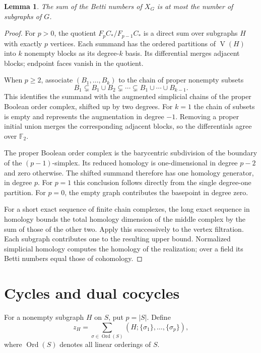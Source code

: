 \documentclass[11pt,a4paper]{article}
\newtheorem{lemma}[theorem]{Lemma}
\newcommand{\F}{\mathbb F_2}
\newcommand{\verts}{\operatorname{V}}
\begin{document}
\begin{lemma}\label{dimension}
The sum of the Betti numbers of $X_G$ is at most the number of subgraphs of $G$.
\end{lemma}
\begin{proof}
For $p>0$, the quotient $F_pC_*/F_{p-1}C_*$ is a direct sum over subgraphs
$H$ with exactly $p$ vertices. Each summand has the ordered partitions of
$\verts(H)$ into $k$ nonempty blocks as its degree-$k$ basis. Its differential
merges adjacent blocks; endpoint faces vanish in the quotient.

When $p\ge2$, associate $(B_1,\ldots,B_k)$ to the chain of proper nonempty
subsets
\[
 B_1\subsetneq B_1\cup B_2\subsetneq\cdots
 \subsetneq B_1\cup\cdots\cup B_{k-1}.
\]
This identifies the summand with the augmented simplicial chains of the
proper Boolean order complex, shifted up by two degrees. For $k=1$ the
chain of subsets is empty and represents the augmentation in degree $-1$.
Removing a proper initial union merges the corresponding adjacent blocks,
so the differentials agree over $\F$.

The proper Boolean order complex is the barycentric subdivision of the
boundary of the $(p-1)$-simplex. Its reduced homology is one-dimensional
in degree $p-2$ and zero otherwise. The shifted summand therefore has one
homology generator, in degree $p$. For $p=1$ this conclusion follows directly
from the single degree-one partition. For $p=0$, the empty graph contributes
the basepoint in degree zero.

For a short exact sequence of finite chain complexes, the long exact sequence
in homology bounds the total homology dimension of the middle complex by the
sum of those of the other two. Apply this successively to the vertex
filtration. Each subgraph contributes one to the resulting upper bound.
Normalized simplicial homology computes the homology of the realization;
over a field its Betti numbers equal those of cohomology.
\end{proof}

\section{Cycles and dual cocycles}
For a nonempty subgraph $H$ on $S$, put $p=|S|$. Define
\begin{equation}\label{cycle}
 z_H=\sum_{\sigma\in\operatorname{Ord}(S)}
       (H;\{\sigma_1\},\ldots,\{\sigma_p\}),
\end{equation}
where $\operatorname{Ord}(S)$ denotes all linear orderings of $S$.
\end{document}
